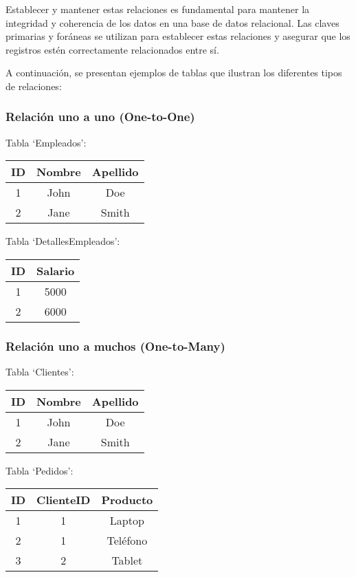 \documentclass[executivepaper]{article}
\begin{document}
Establecer y mantener estas relaciones es fundamental para mantener la integridad y coherencia de los datos en una base de datos relacional. Las claves primarias y foráneas se utilizan para establecer estas relaciones y asegurar que los registros estén correctamente relacionados entre sí.

A continuación, se presentan ejemplos de tablas que ilustran los diferentes tipos de relaciones:

\subsubsection*{Relación uno a uno (One-to-One)}
Tabla \enquote*{Empleados}:
\begin{center}
    \begin{tabular}{|c|c|c|}
    \hline
    \textbf{ID} & \textbf{Nombre} & \textbf{Apellido} \\
    \hline
    1 & John & Doe \\
    \hline
    2 & Jane & Smith \\
    \hline
    \end{tabular}
    \end{center}

Tabla \enquote*{DetallesEmpleados}:
\begin{center}
\begin{tabular}{|c|c|}
\hline
\textbf{ID} & \textbf{Salario} \\
    \hline
    1 & 5000 \\
    \hline
    2 & 6000 \\
    \hline
\end{tabular}
\end{center}

\subsubsection*{Relación uno a muchos (One-to-Many)}
Tabla \enquote*{Clientes}:
\begin{center}
\begin{tabular}{|c|c|c|}
\hline
\textbf{ID} & \textbf{Nombre} & \textbf{Apellido} \\
    \hline
    1 & John & Doe \\
    \hline
    2 & Jane & Smith \\
    \hline
\end{tabular}
\end{center}

Tabla \enquote*{Pedidos}:
\begin{center}
\begin{tabular}{|c|c|c|}
\hline
\textbf{ID} & \textbf{ClienteID} & \textbf{Producto} \\
\hline
1 & 1 & Laptop \\
\hline
2 & 1 & Teléfono \\
\hline
3 & 2 & Tablet \\
\hline
\end{tabular}
\end{center}
\end{document}
